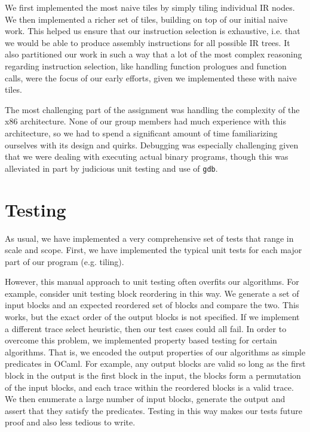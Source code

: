 \documentclass{hw}
\begin{document}
We first implemented the most naive tiles by simply tiling individual IR nodes.
We then implemented a richer set of tiles, building on top of our initial naive
work. This helped us ensure that our instruction selection is exhaustive, i.e.
that we would be able to produce assembly instructions for all possible IR trees.
It also partitioned our work in such a way that a lot of the most complex reasoning
regarding instruction selection, like handling function prologues and function calls,
were the focus of our early efforts, given we implemented these with naive tiles. 

The most challenging part of the assignment was handling the complexity of the x86
architecture. None of our group members had much experience with this architecture,
so we had to spend a significant amount of time familiarizing ourselves with
its design and quirks. Debugging was especially challenging given that we were
dealing with executing actual binary programs, though this was alleviated in part
by judicious unit testing and use of \texttt{gdb}.

\section{Testing}\label{sec:testing}
As usual, we have implemented a very comprehensive set of tests that range in
scale and scope. First, we have implemented the typical unit tests for each major
part of our program (e.g. tiling).




However, this manual approach to unit testing often overfits our algorithms.
For example, consider unit testing block reordering in this way. We generate a
set of input blocks and an expected reordered set of blocks and compare the
two. This works, but the exact order of the output blocks is not specified. If
we implement a different trace select heuristic, then our test cases could all
fail. In order to overcome this problem, we implemented property based testing
for certain algorithms. That is, we encoded the output properties of our
algorithms as simple predicates in OCaml. For example, any output blocks are
valid so long as the first block in the output is the first block in the input,
the blocks form a permutation of the input blocks, and each trace within the
reordered blocks is a valid trace. We then enumerate a large number of input
blocks, generate the output and assert that they satisfy the predicates.
Testing in this way makes our tests future proof and also less tedious to
write.
\end{document}
